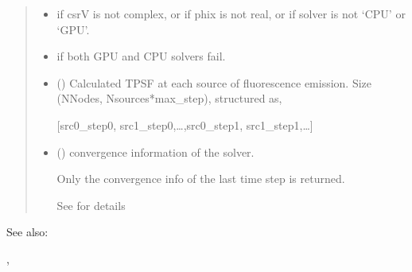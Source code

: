 \documentclass[letterpaper,10pt,english]{sphinxmanual}
\begin{document}
\begin{fulllineitems}
\begin{quote}
\begin{description}
\begin{itemize}
\end{itemize}

\begin{itemize}
\item {} 
\sphinxAtStartPar
{} \textendash{} if csrV is not complex, or if phix is not real, or if solver is not ‘CPU’ or ‘GPU’.

\item {} 
\sphinxAtStartPar
{} \textendash{} if both GPU and CPU solvers fail.

\end{itemize}

\sphinxAtStartPar
\begin{itemize}
\item {} 
\sphinxAtStartPar
{} () \textendash{} Calculated TPSF at each source of fluorescence emission. Size (NNodes, Nsources*max\_step), structured as,

\sphinxAtStartPar
{[}src0\_step0, src1\_step0,…,src0\_step1, src1\_step1,…{]}

\item {} 
\sphinxAtStartPar
{} () \textendash{} convergence information of the solver.

\sphinxAtStartPar
Only the convergence info of the last time step is returned.

\sphinxAtStartPar
See {\hyperref[\detokenize{_autosummary/nirfasterff.utils.ConvergenceInfo:nirfasterff.utils.ConvergenceInfo}]{}} for details

\end{itemize}


\end{description}\end{quote}


\begin{sphinxseealso}{See also:}

\sphinxAtStartPar
{\hyperref[\detokenize{_autosummary/nirfasterff.math.gen_mass_matrix:nirfasterff.math.gen_mass_matrix}]{}}, {\hyperref[\detokenize{_autosummary/nirfasterff.math.get_field_TR:nirfasterff.math.get_field_TR}]{}}


\end{sphinxseealso}


\end{fulllineitems}
\end{document}
